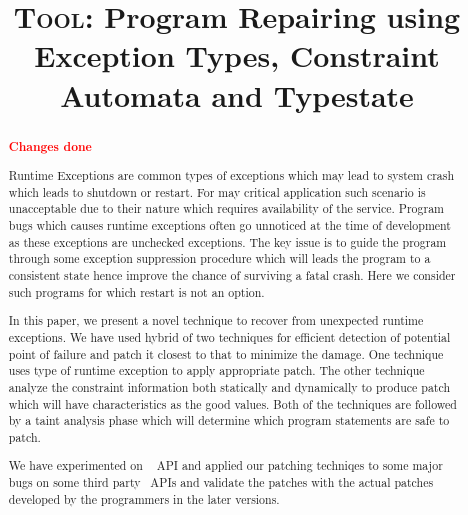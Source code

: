 \documentclass[pldi]{sigplanconf}
\def\tool{\textsc{Tool}\xspace}
\def\papertitle{\tool: Program Repairing using Exception Types, Constraint
Automata and Typestate}
\begin{document}
\title{\Large \bf \papertitle}

\maketitle

\begin{abstract}
\small
\textcolor{red}{\textbf{Changes done}}\newline

Runtime Exceptions are common types of exceptions which may lead to system crash
which leads to shutdown or restart. For may critical application such scenario
is unacceptable due to their nature which requires availability of the service. 
Program bugs which causes runtime exceptions often go unnoticed at the time of
development as these exceptions are unchecked exceptions. The key issue is to
guide the program through some exception suppression procedure which will leads
the program to a consistent state hence improve the chance of surviving a fatal
crash. Here we consider such programs for which restart is not an option.

In this paper, we present a novel technique to recover from unexpected runtime
exceptions. We have used hybrid of two techniques for efficient detection of
potential point of failure and patch it closest to that to minimize the damage. 
One technique uses type of runtime exception to apply appropriate patch. The
other technique analyze the constraint information both statically and
dynamically to produce patch which will have characteristics as the good values.
Both of the techniques are followed by a taint analysis phase which will
determine which program statements are safe to patch.

We have experimented on \java\  API and applied our patching
techniqes to some major bugs on some third party \java\ APIs and validate the
patches with the actual patches developed by the programmers in the later
versions.

\end{abstract}

% 














\raggedright
\small


\end{document}
